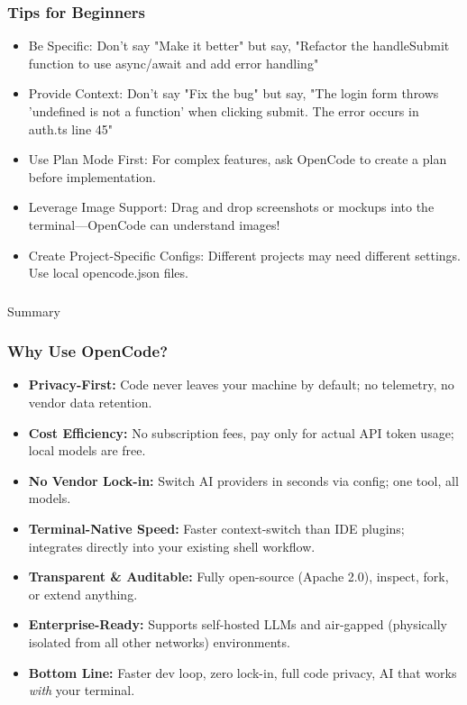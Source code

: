 \begin{frame}[fragile]\frametitle{Tips for Beginners}
  \begin{itemize}
    \item Be Specific: 
Don't say "Make it better" but say, "Refactor the handleSubmit function to use async/await and add error handling"

    \item Provide Context: Don't say "Fix the bug" but say, "The login form throws 'undefined is not a function' when clicking submit. The error occurs in auth.ts line 45"

    \item Use Plan Mode First: For complex features, ask OpenCode to create a plan before implementation.

    \item Leverage Image Support: Drag and drop screenshots or mockups into the terminal—OpenCode can understand images!

    \item Create Project-Specific Configs: Different projects may need different settings. Use local opencode.json files.
  \end{itemize}
\end{frame}


\begin{frame}[fragile]\frametitle{}

\begin{center}
{\Large Summary}
\end{center}
\end{frame}

\begin{frame}[fragile]\frametitle{Why Use OpenCode?}
  \begin{itemize}
    \item \textbf{Privacy-First:} Code never leaves your machine by default; no telemetry, no vendor data retention.
    \item \textbf{Cost Efficiency:} No subscription fees,  pay only for actual API token usage; local models are free.
    \item \textbf{No Vendor Lock-in:} Switch AI providers in seconds via config; one tool, all models.
    \item \textbf{Terminal-Native Speed:} Faster context-switch than IDE plugins; integrates directly into your existing shell workflow.
    \item \textbf{Transparent \& Auditable:} Fully open-source (Apache 2.0),  inspect, fork, or extend anything.
    \item \textbf{Enterprise-Ready:} Supports self-hosted LLMs and air-gapped (physically isolated from all other networks) environments.
    \item \textbf{Bottom Line:} Faster dev loop, zero lock-in, full code privacy,  AI that works \textit{with} your terminal.	
  \end{itemize}
\end{frame}

